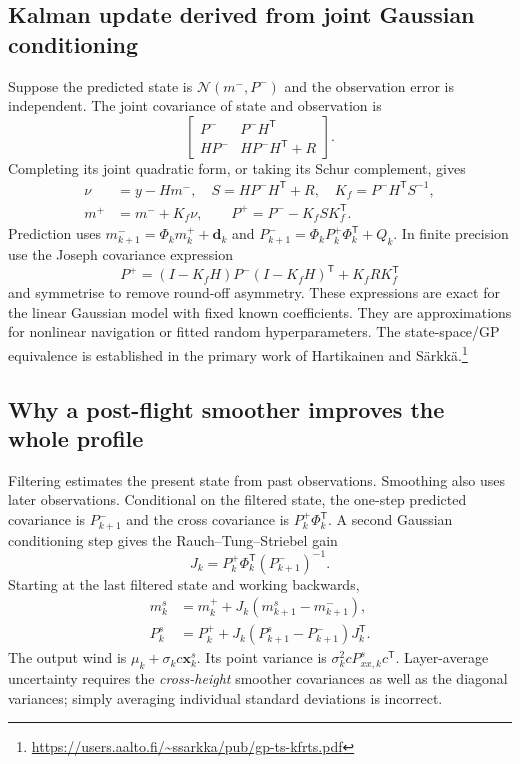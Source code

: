 \documentclass[11pt,a4paper]{article}
\numberwithin{equation}{section}
\begin{document}
\subsection{Kalman update derived from joint Gaussian conditioning}
Suppose the predicted state is $\mathcal N(m^-,P^-)$ and the observation error is independent. The joint covariance of state and observation is
\begin{equation}
 \begin{bmatrix}P^-&P^-H^{\mathsf T}\\HP^-&HP^-H^{\mathsf T}+R\end{bmatrix}.
\end{equation}
Completing its joint quadratic form, or taking its Schur complement, gives
\begin{align}
 \nu&=y-Hm^-,\quad S=HP^-H^{\mathsf T}+R,\quad K_f=P^-H^{\mathsf T}S^{-1},\\
 m^+&=m^-+K_f\nu,\qquad
 P^+=P^--K_fSK_f^{\mathsf T}.
\end{align}
Prediction uses $m^-_{k+1}=\Phi_k m^+_k+\mathbf d_k$ and $P^-_{k+1}=\Phi_kP^+_k\Phi_k^{\mathsf T}+Q_k$. In finite precision use the Joseph covariance expression
\begin{equation}
 P^+=(I-K_fH)P^-(I-K_fH)^{\mathsf T}+K_fRK_f^{\mathsf T}
\end{equation}
and symmetrise to remove round-off asymmetry. These expressions are exact for the linear Gaussian model with fixed known coefficients. They are approximations for nonlinear navigation or fitted random hyperparameters. The state-space/GP equivalence is established in the primary work of Hartikainen and S\"arkk\"a.\footnote{\url{https://users.aalto.fi/~ssarkka/pub/gp-ts-kfrts.pdf}}

\subsection{Why a post-flight smoother improves the whole profile}
Filtering estimates the present state from past observations. Smoothing also uses later observations. Conditional on the filtered state, the one-step predicted covariance is $P^-_{k+1}$ and the cross covariance is $P^+_k\Phi_k^{\mathsf T}$. A second Gaussian conditioning step gives the Rauch--Tung--Striebel gain
\begin{equation}
 J_k=P^+_k\Phi_k^{\mathsf T}(P^-_{k+1})^{-1}.
\end{equation}
Starting at the last filtered state and working backwards,
\begin{align}
 m^s_k&=m^+_k+J_k(m^s_{k+1}-m^-_{k+1}),\\
 P^s_k&=P^+_k+J_k(P^s_{k+1}-P^-_{k+1})J_k^{\mathsf T}.
\end{align}
The output wind is $\mu_k+\sigma_k c\mathbf x^s_k$. Its point variance is $\sigma_k^2 cP^s_{xx,k}c^{\mathsf T}$. Layer-average uncertainty requires the \emph{cross-height} smoother covariances as well as the diagonal variances; simply averaging individual standard deviations is incorrect.
\end{document}
